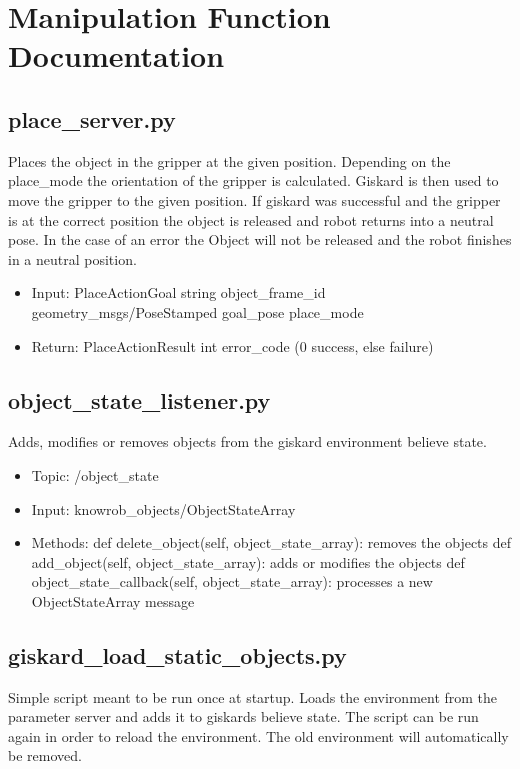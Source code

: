 \documentclass[main.tex]{subfiles}
\begin{document}
	\begingroup

	\renewcommand{\cleardoublepage}{}

	\renewcommand{\clearpage}{}

	\chapter{Manipulation Function Documentation}

		\chapterauthor{}
		
		\section{place\_server.py}  
		Places the object in the gripper at the given position. Depending on the place\_mode the orientation of the gripper is calculated. Giskard is then used to move the gripper to the given position. If giskard was successful and the gripper is at the correct position the object is released and robot returns into a neutral pose. In the case of an error the Object will not be released and the robot finishes in a neutral position. 
		
		\begin{itemize}
			\item Input: PlaceActionGoal 
				\subitem string object\_frame\_id 
				\subitem geometry\_msgs/PoseStamped goal\_pose
				\subitem place\_mode
			\item Return: PlaceActionResult
				\subitem int error\_code (0 success, else failure)
		\end{itemize}
	
		\section{object\_state\_listener.py} 
		Adds, modifies or removes objects from the giskard environment believe state.
		
		\begin{itemize}
			\item Topic: /object\_state
			\item Input: knowrob\_objects/ObjectStateArray
			\item Methods:
				\subitem def delete\_object(self, object\_state\_array): removes the objects
				\subitem def add\_object(self, object\_state\_array): adds or modifies the objects
				\subitem def object\_state\_callback(self, object\_state\_array): processes a new ObjectStateArray message
		\end{itemize}
		
		\section{giskard\_load\_static\_objects.py} 
		Simple script meant to be run once at startup. Loads the environment from the parameter server and adds it to giskards believe state. 
		The script can be run again in order to reload the environment. The old environment will automatically be removed.

	\endgroup
\end{document}
